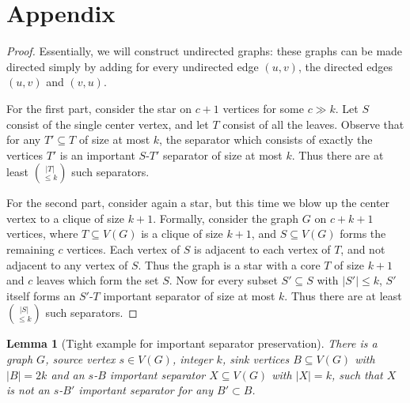 \documentclass[11pt]{article}
\newtheorem{lemma}[theorem]{Lemma}
\begin{document}



\appendix

\section{Appendix}

\lowerbound*
\begin{proof} 
Essentially, we will construct undirected graphs: these graphs can be made directed simply by adding for every undirected edge $(u,v)$, the directed edges $(u,v)$ and $(v,u)$.

For the first part, consider the star on $c + 1$ vertices for some $c \gg k$. Let $S$ consist of the single center vertex, and let $T$ consist of all the leaves. Observe that for any $T' \subseteq T$ of size at most $k$, the separator which consists of exactly the vertices $T'$ is an important $S$-$T'$ separator of size at most $k$. Thus there are at least ${|T| \choose \leq k}$ such separators.

For the second part, consider again a star, but this time we blow up the center vertex to a clique of size $k + 1$. Formally, consider the graph $G$ on $c + k + 1$ vertices, where $T \subseteq V(G)$ is a clique of size $k + 1$, and $S \subseteq V(G)$ forms the remaining $c$ vertices. Each vertex of $S$ is adjacent to each vertex of $T$, and not adjacent to any vertex of $S$. Thus the graph is a star with a core $T$ of size $k + 1$ and $c$ leaves which form the set $S$. Now for every subset $S' \subseteq S$ with $|S'| \leq k$, $S'$ itself forms an $S'$-$T$ important separator of size at most $k$. Thus there are at least ${|S| \choose \leq k}$ such separators.    
\end{proof}

\begin{lemma}[Tight example for important separator preservation]\label{lemma:impseppreserve}
There is a graph $G$, source vertex $s \in V(G)$, integer $k$, sink vertices $B \subseteq V(G)$ with $|B| = 2k$ and an $s$-$B$ important separator $X \subseteq V(G)$ with $|X| = k$, such that $X$ is not an $s$-$B'$ important separator for any $B' \subset B$.
\end{lemma}
\end{document}

